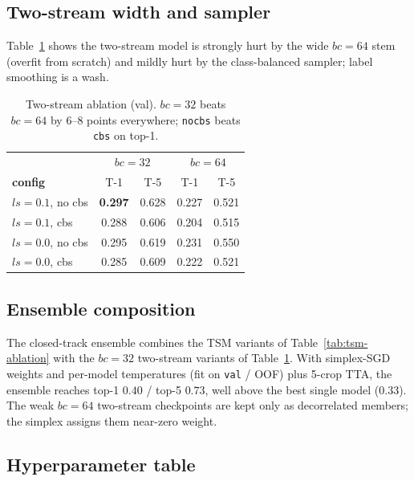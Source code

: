\documentclass[10pt,twocolumn,letterpaper]{article}
\begin{document}
\subsection{Two-stream width and sampler}

Table~\ref{tab:twostream-ablation} shows the two-stream model is
strongly hurt by the wide $bc{=}64$ stem (overfit from scratch) and
mildly hurt by the class-balanced sampler; label smoothing is a wash.

\begin{table}[h]
\centering
\small
\begin{tabular}{lcccc}
\toprule
 & \multicolumn{2}{c}{$bc{=}32$} & \multicolumn{2}{c}{$bc{=}64$} \\
\textbf{config} & T-1 & T-5 & T-1 & T-5 \\
\midrule
$ls{=}0.1$, no cbs & \textbf{0.297} & 0.628 & 0.227 & 0.521 \\
$ls{=}0.1$, cbs    & 0.288 & 0.606 & 0.204 & 0.515 \\
$ls{=}0.0$, no cbs & 0.295 & 0.619 & 0.231 & 0.550 \\
$ls{=}0.0$, cbs    & 0.285 & 0.609 & 0.222 & 0.521 \\
\bottomrule
\end{tabular}
\caption{Two-stream ablation (val). $bc{=}32$ beats $bc{=}64$ by
$6$--$8$ points everywhere; \texttt{nocbs} beats \texttt{cbs} on top-1.}
\label{tab:twostream-ablation}
\end{table}

\subsection{Ensemble composition}

The closed-track ensemble combines the TSM variants of
Table~\ref{tab:tsm-ablation} with the $bc{=}32$ two-stream variants of
Table~\ref{tab:twostream-ablation}. With simplex-SGD weights and
per-model temperatures (fit on \texttt{val} / OOF) plus 5-crop TTA, the
ensemble reaches top-1 $0.40$ / top-5 $0.73$, well above the best single
model ($0.33$). The weak $bc{=}64$ two-stream checkpoints are kept only
as decorrelated members; the simplex assigns them near-zero weight.

\subsection{Hyperparameter table}
\end{document}
